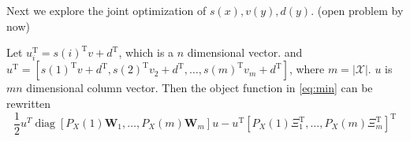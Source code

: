 \documentclass{article}
\DeclareMathOperator{\diag}{diag}
\def\T{\mathrm{T}}
\begin{document}
Next we explore the joint optimization of $s(x),v(y),d(y)$. (open problem by now)

Let $u_i^\T=s(i)^\T v+d^\T$, which is a $n$ dimensional vector. and 
$u^\T=[s(1)^\T v+d^\T,s(2)^\T v_2+d^\T,\dots,s(m)^\T v_m+d^\T]$, where $m=|\mathcal{X}|$.
$u$ is $mn$ dimensional column vector. Then the object function in \eqref{eq:min} can be rewritten %
\begin{equation}\label{eq:joint_opt}
\frac{1}{2}u^T \diag[P_X(1)\bm{W}_1,\dots,P_X(m)\bm{W}_m] u -u^\T [P_X(1)\Xi^\T_1,\dots,P_X(m)\Xi^\T_m]^\T
\end{equation}

\end{document}

